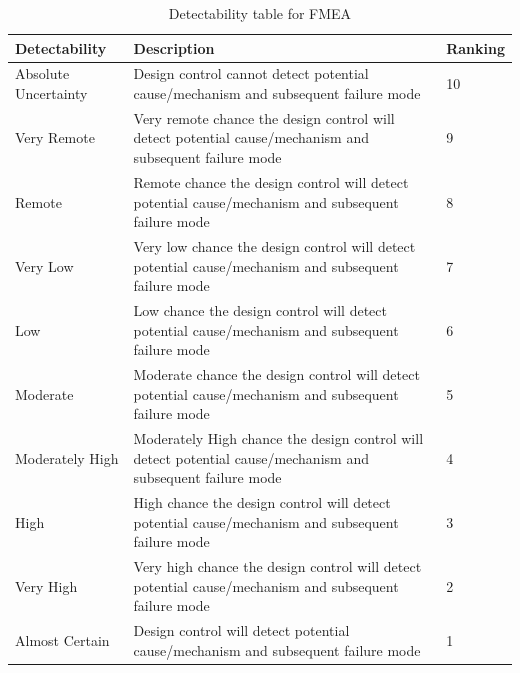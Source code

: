 \documentclass[ExampleMasters.tex]{subfiles}
\begin{document}
\begin{table}[h]
	\centering
	\caption{Detectability table for \gls{FMEA} \cite{FMEA_tables}}
	\label{tab:fmea_detectability}
	\begin{tabular}{p{4cm}|p{9cm}|p{2cm}|}
		Detectability & Description & Ranking   \\ \hline
		Absolute Uncertainty & Design control cannot detect potential cause/mechanism and
		subsequent failure mode & 10        \\
		Very Remote &  Very remote chance the design control will detect potential
		cause/mechanism and subsequent failure mode & 9    \\
		Remote &  Remote chance the design control will detect potential
		cause/mechanism and subsequent failure mode & 8       \\
		Very Low & Very low chance the design control will detect potential
		cause/mechanism and subsequent failure mode & 7   \\
		Low &  Low chance the design control will detect potential
		cause/mechanism and subsequent failure mode & 6  \\
		Moderate & Moderate chance the design control will detect potential
		cause/mechanism and subsequent failure mode & 5  \\
		Moderately High & Moderately High chance the design control will detect
		potential cause/mechanism and subsequent failure mode & 4 \\
	High & High chance the design control will detect potential
	cause/mechanism and subsequent failure mode & 3 \\
	Very High	& Very high chance the design control will detect potential
	cause/mechanism and subsequent failure mode & 2 \\
		Almost Certain & Design control will detect potential cause/mechanism and
		subsequent failure mode & 1 \\
	\end{tabular} \\
\end{table}
 






 

  
  
  
 

  
  
 
\end{document}
